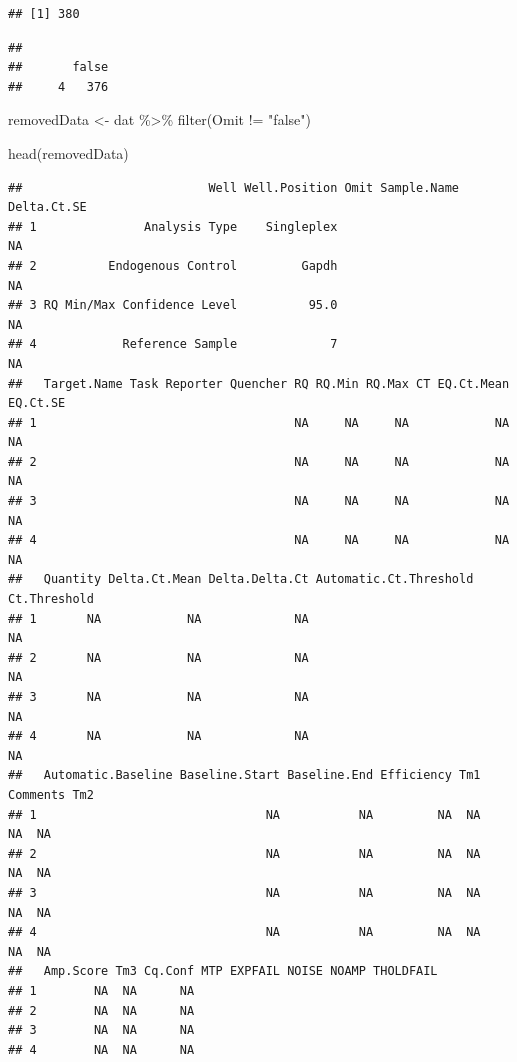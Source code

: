 \documentclass[
]{book}
\newenvironment{Shaded}{\begin{snugshade}}{\end{snugshade}}
\newcommand{\CommentTok}[1]{\textcolor[rgb]{0.56,0.35,0.01}{\textit{#1}}}
\newcommand{\FunctionTok}[1]{\textcolor[rgb]{0.00,0.00,0.00}{#1}}
\newcommand{\NormalTok}[1]{#1}
\newcommand{\OtherTok}[1]{\textcolor[rgb]{0.56,0.35,0.01}{#1}}
\newcommand{\SpecialCharTok}[1]{\textcolor[rgb]{0.00,0.00,0.00}{#1}}
\newcommand{\StringTok}[1]{\textcolor[rgb]{0.31,0.60,0.02}{#1}}
\begin{document}
\begin{verbatim}
## [1] 380
\end{verbatim}

\begin{Shaded}
\end{Shaded}

\begin{verbatim}
## 
##       false 
##     4   376
\end{verbatim}

\begin{Shaded}
\begin{Highlighting}[]
\NormalTok{removedData }\OtherTok{\textless{}{-}}\NormalTok{ dat }\SpecialCharTok{\%\textgreater{}\%}
  \FunctionTok{filter}\NormalTok{(Omit }\SpecialCharTok{!=} \StringTok{"false"}\NormalTok{)}

\FunctionTok{head}\NormalTok{(removedData)}
\end{Highlighting}
\end{Shaded}

\begin{verbatim}
##                          Well Well.Position Omit Sample.Name Delta.Ct.SE
## 1               Analysis Type    Singleplex                           NA
## 2          Endogenous Control         Gapdh                           NA
## 3 RQ Min/Max Confidence Level          95.0                           NA
## 4            Reference Sample             7                           NA
##   Target.Name Task Reporter Quencher RQ RQ.Min RQ.Max CT EQ.Ct.Mean EQ.Ct.SE
## 1                                    NA     NA     NA            NA       NA
## 2                                    NA     NA     NA            NA       NA
## 3                                    NA     NA     NA            NA       NA
## 4                                    NA     NA     NA            NA       NA
##   Quantity Delta.Ct.Mean Delta.Delta.Ct Automatic.Ct.Threshold Ct.Threshold
## 1       NA            NA             NA                                  NA
## 2       NA            NA             NA                                  NA
## 3       NA            NA             NA                                  NA
## 4       NA            NA             NA                                  NA
##   Automatic.Baseline Baseline.Start Baseline.End Efficiency Tm1 Comments Tm2
## 1                                NA           NA         NA  NA       NA  NA
## 2                                NA           NA         NA  NA       NA  NA
## 3                                NA           NA         NA  NA       NA  NA
## 4                                NA           NA         NA  NA       NA  NA
##   Amp.Score Tm3 Cq.Conf MTP EXPFAIL NOISE NOAMP THOLDFAIL
## 1        NA  NA      NA                                  
## 2        NA  NA      NA                                  
## 3        NA  NA      NA                                  
## 4        NA  NA      NA
\end{verbatim}
\end{document}
